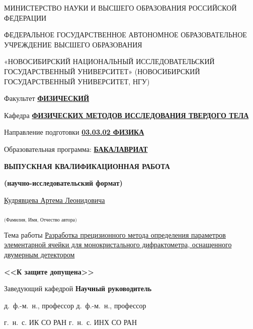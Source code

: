 \documentclass[a4paper,14pt]{extarticle}
\newcounter{x}
\begin{document}
\begin{titlepage}
\thispagestyle{empty}
\begin{spacing}{1.15}
\footnotesize
\begin{center}
    МИНИСТЕРСТВО НАУКИ И ВЫСШЕГО ОБРАЗОВАНИЯ РОССИЙСКОЙ ФЕДЕРАЦИИ
    \vspace{20pt}

    ФЕДЕРАЛЬНОЕ ГОСУДАРСТВЕННОЕ АВТОНОМНОЕ ОБРАЗОВАТЕЛЬНОЕ\\
    УЧРЕЖДЕНИЕ ВЫСШЕГО ОБРАЗОВАНИЯ
    \vspace{6pt}

    «НОВОСИБИРСКИЙ НАЦИОНАЛЬНЫЙ ИССЛЕДОВАТЕЛЬСКИЙ ГОСУДАРСТВЕННЫЙ УНИВЕРСИТЕТ» (НОВОСИБИРСКИЙ ГОСУДАРСТВЕННЫЙ УНИВЕРСИТЕТ, НГУ)
    \vspace{10pt}
\end{center}
Факультет \uline{\textbf{ФИЗИЧЕСКИЙ}}
\vspace{10pt}

\noindent
Кафедра \uline{\textbf{ФИЗИЧЕСКИХ МЕТОДОВ ИССЛЕДОВАНИЯ ТВЕРДОГО ТЕЛА}}
\vspace{8mm}

\noindent
Направление подготовки \uline{\textbf{03.03.02 ФИЗИКА}}
\vspace{10pt}

\noindent
Образовательная программа: \uline{\textbf{БАКАЛАВРИАТ}}
\vspace{8mm}
\begin{center}
    \textbf{ВЫПУСКНАЯ КВАЛИФИКАЦИОННАЯ РАБОТА}

    \textbf{(научно-исследовательский формат)}
    \vspace{8mm}

    \uline{\hfill Кудрявцева Артема Леонидовича \hfill}

    $_\text{(Фамилия, Имя, Отчество автора)}$
    \vspace{8mm}
\end{center}
Тема работы \uline{Разработка прецизионного метода определения параметров элементарной ячейки для монокристального дифрактометра, оснащенного двумерным детектором \hfill}
\vfill

\noindent
\textbf{<<К защите допущена>>}

\noindent
Заведующий кафедрой \hfill \textbf{Научный руководитель}
\vspace{10pt}

\noindent
д.~ф.-м.~н., профессор \hfill д.~ф.-м.~н., профессор
\vspace{10pt}

\noindent
г.~н.~с. ИК СО РАН \hfill г.~н.~с. ИНХ СО РАН
\vspace{10pt}


\end{spacing}
\end{titlepage}
\end{document}
